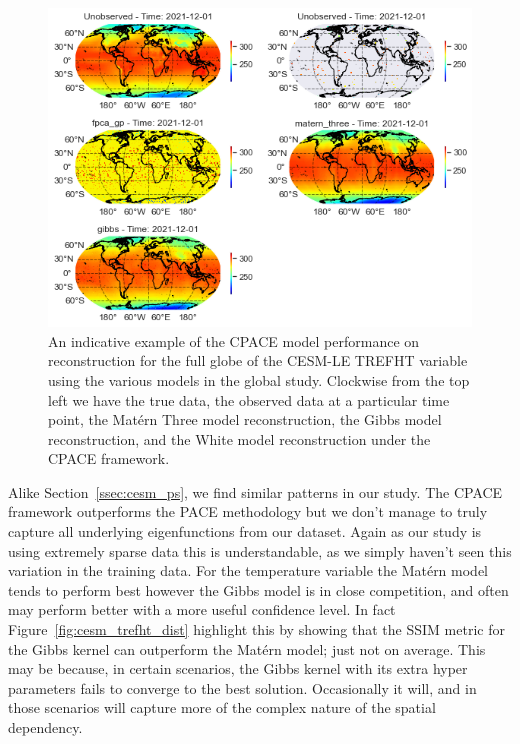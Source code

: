 \begin{figure}
	\centering
	\includegraphics[width=\textwidth]{full_ex_trefht_globe}
	\caption[An indicative example of the CPACE model performance on reconstruction for the full globe of the CESM-LE TREFHT variable using the various models in the global study.]{An indicative example of the CPACE model performance on reconstruction for the full globe of the CESM-LE TREFHT variable using the various models in the global study. Clockwise from the top left we have the true data, the observed data at a particular time point, the Mat\'ern Three model reconstruction, the Gibbs model reconstruction, and the White model reconstruction under the CPACE framework.}
	\label{fig:full_ex_trefht_globe}
\end{figure}

Alike Section~\ref{ssec:cesm_ps}, we find similar patterns in our study.
The CPACE framework outperforms the PACE methodology but we don't manage to truly capture all underlying eigenfunctions from our dataset.
Again as our study is using extremely sparse data this is understandable, as we simply haven't seen this variation in the training data.
For the temperature variable the Mat\'ern model tends to perform best however the Gibbs model is in close competition, and often may perform better with a more useful confidence level.
In fact Figure~\ref{fig:cesm_trefht_dist} highlight this by showing that the SSIM metric for the Gibbs kernel can outperform the Mat\'ern model; just not on average.
This may be because, in certain scenarios, the Gibbs kernel with its extra hyper parameters fails to converge to the best solution. 
Occasionally it will, and in those scenarios will capture more of the complex nature of the spatial dependency. 

